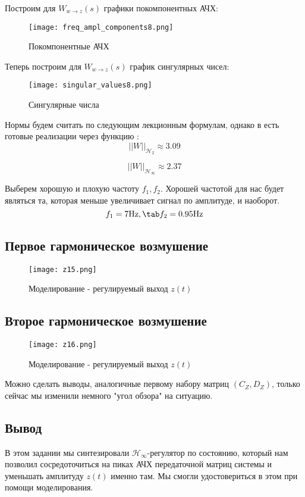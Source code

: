 Построим для $W_{w\rightarrow z}(s)$ графики покомпонентных АЧХ:
\begin{figure}[ht]
    \centering
    \texttt{[image: freq\_ampl\_components8.png]}
    \caption{Покомпонентные АЧХ}
  \end{figure}
Теперь построим для $W_{w\rightarrow z}(s)$ график сингулярных чисел:
\begin{figure}[ht]
  \centering
  \texttt{[image: singular\_values8.png]}
  \caption{Сингулярные числа}
\end{figure}
Нормы будем считать по следующим лекционным формулам, однако в  
есть готовые реализации через функцию :
$$
    ||W||_{\mathcal{H}_2} \approx 3.09
$$

$$
    ||W||_{\mathcal{H}_\infty} \approx  2.37
$$

Выберем хорошую и плохую частоту $f_1, f_2$. 
Хорошей частотой для нас будет являться та, которая меньше увеличивает сигнал по амплитуде, и наоборот.
$$
    f_1 = 7 \text{Hz}, \tab f_2 = 0.95 \text{Hz}
$$

\newpage
\subsection{Первое гармоническое возмушение}
\begin{figure}[ht]
    \centering
    \texttt{[image: z15.png]}
    \caption{Моделирование -  регулируемый выход $z(t)$}
  \end{figure}
\newpage
\subsection{Второе гармоническое возмушение}
\begin{figure}[ht]
    \centering
    \texttt{[image: z16.png]}
    \caption{Моделирование -  регулируемый выход $z(t)$}
  \end{figure}

  Можно сделать выводы, аналогичные первому набору матриц $(C_Z,D_Z)$, только сейчас мы изменили немного "угол обзора" на ситуацию.

\subsection{Вывод}

В этом задании мы синтезировали $\mathcal{H}_\infty$-регулятор по состоянию, который нам позволил 
сосредоточиться на пиках АЧХ передаточной матриц системы и уменьшать амплитуду $z(t)$ именно там. 
Мы смогли удостовериться в этом при помощи моделирования.

\endinput